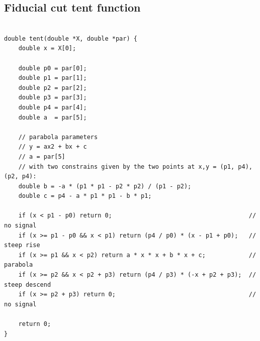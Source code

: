 \subsection{ Fiducial cut tent function}\label{sec:tent_function}

\begin{verbatim}

double tent(double *X, double *par) {
    double x = X[0];

    double p0 = par[0];
    double p1 = par[1];
    double p2 = par[2];
    double p3 = par[3];
    double p4 = par[4];
    double a  = par[5];

    // parabola parameters
    // y = ax2 + bx + c
    // a = par[5]
    // with two constrains given by the two points at x,y = (p1, p4), (p2, p4):
    double b = -a * (p1 * p1 - p2 * p2) / (p1 - p2);
    double c = p4 - a * p1 * p1 - b * p1;

    if (x < p1 - p0) return 0;                                      // no signal
    if (x >= p1 - p0 && x < p1) return (p4 / p0) * (x - p1 + p0);   // steep rise
    if (x >= p1 && x < p2) return a * x * x + b * x + c;            // parabola
    if (x >= p2 && x < p2 + p3) return (p4 / p3) * (-x + p2 + p3);  // steep descend
    if (x >= p2 + p3) return 0;                                     // no signal

    return 0;
}

\end{verbatim}

